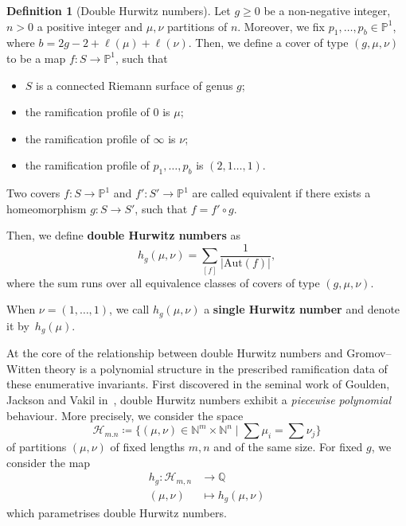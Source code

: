\documentclass[10pt]{amsart}
\theoremstyle{plain}
\theoremstyle{definition}
\newtheorem{defi}[defi]{Definition}
\theoremstyle{definition}
\theoremstyle{plain}
\theoremstyle{plain}
\theoremstyle{remark}
\theoremstyle{plain}
\theoremstyle{plain}
\begin{document}
\begin{defi}[Double Hurwitz numbers]\label{def-hur}
Let $g\ge0$ be a non-negative integer, $n>0$ a positive integer and $\mu,\nu$ partitions of $n$. Moreover, we fix $p_1,\dots,p_b\in\mathbb{P}^1$, where $b=2g-2+\ell(\mu)+\ell(\nu)$. Then, we define a cover of type $(g,\mu,\nu)$ to be a map $f\colon S\to\mathbb{P}^1$, such that
\begin{itemize}
    \item $S$ is a connected Riemann surface of genus $g$;
    \item the ramification profile of $0$ is $\mu$;
    \item the ramification profile of $\infty$ is $\nu$;
    \item the ramification profile of $p_1,\dots,p_b$ is $(2,1\dots,1)$.
\end{itemize}
Two covers $f\colon S\to\mathbb{P}^1$ and $f'\colon S'\to\mathbb{P}^1$ are called equivalent if there exists a homeomorphism $g\colon S\to S'$, such that $f= f'\circ g$.

Then, we define \textbf{double Hurwitz numbers} as
\begin{equation*}
    h_g(\mu,\nu)=\sum_{[f]}\frac{1}{|\mathrm{Aut}(f)|},
\end{equation*}
where the sum runs over all equivalence classes of covers of type $(g,\mu,\nu)$.

When $\nu=(1,\dots,1)$, we call $h_g(\mu,\nu)$ a \textbf{single Hurwitz number} and denote it by~$h_g(\mu)$.
\end{defi}

At the core of the relationship between double Hurwitz numbers and Gromov--Witten theory is a polynomial structure in the prescribed ramification data of these enumerative invariants. First discovered in the seminal work of Goulden, Jackson and Vakil in~\cite{GJV05}, double Hurwitz numbers exhibit a \textit{piecewise polynomial} behaviour. More precisely, we consider the space \begin{equation*}
    \mathcal{H}_{m.n}\coloneqq\{(\mu,\nu)\in\mathbb{N}^m\times\mathbb{N}^n\mid \sum \mu_i=\sum \nu_j\}
\end{equation*}
of partitions $(\mu,\nu)$ of fixed lengths $m,n$ and of the same size. For fixed $g$, we consider the map
\begin{align*}
    h_g\colon \mathcal{H}_{m,n}&\to\mathbb{Q}\\
    (\mu,\nu)&\mapsto h_g(\mu,\nu)
\end{align*}
which parametrises double Hurwitz numbers.
\end{document}
